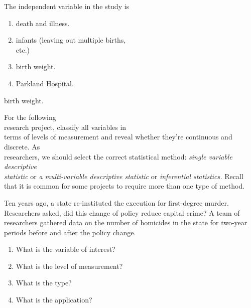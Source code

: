 \documentclass[11pt]{book}\usepackage[]{graphicx}\usepackage[]{color}
\begin{document}
\begin{exercises}
\begin{exercise}
    The independent variable in the study is
    \begin{enumerate}
    \samepage
    \item death and illness.
    \samepage
    \item infants (leaving out multiple births, \\ etc.)
    \samepage
    \item birth weight.
    \samepage
    \item Parkland Hospital.
    \end{enumerate}
    \samepage
    \vspace{3mm}

  \end{exercise}
  \vspace{2mm}
  \begin{solution}
    birth weight.
  \end{solution}

\begin{exercise}  %

  For the following \\ research project, classify all variables in \\ terms of levels of measurement and reveal whether  they're continuous and discrete.  As \\ researchers, we should select the correct statistical method: {\emph{single variable descriptive}}  \\ {\emph{statistic}} or {\emph{a multi-variable descriptive  statistic}} or  {\emph{inferential statistics.}}  Recall that it is common for some projects to require more than one type of method.

	  Ten years ago, a state re-instituted the execution for first-degree murder.  Researchers asked, did this change of policy reduce capital crime?  A team of researchers gathered data on the number of homicides in the state for two-year periods before and after the policy change.
	  
\begin{enumerate}
\item What is the variable of interest?
\item What is the level of measurement?
\item What is the type?
\item What is the application?
\end{enumerate}

    \vspace{3mm}


\end{exercise}
\end{exercises}
\end{document}
